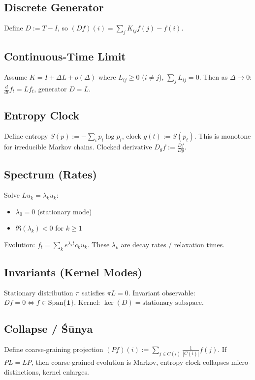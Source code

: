 \documentclass[12pt, oneside]{article}
\begin{document}
\subsection{Discrete Generator}

Define $D := T - I$, so $(Df)(i) = \sum_j K_{ij} f(j) - f(i)$.

\subsection{Continuous-Time Limit}

Assume $K = I + \Delta L + o(\Delta)$ where $L_{ij} \geq 0$ ($i \neq j$), $\sum_j L_{ij} = 0$. Then as $\Delta \to 0$: $\frac{d}{dt} f_t = L f_t$, generator $D = L$.

\subsection{Entropy Clock}

Define entropy $S(p) := -\sum_i p_i \log p_i$, clock $g(t) := S(p_t)$. This is monotone for irreducible Markov chains. Clocked derivative $D_g f := \frac{Df}{Dg}$.

\subsection{Spectrum (Rates)}

Solve $L u_k = \lambda_k u_k$:
\begin{itemize}
    \item $\lambda_0 = 0$ (stationary mode)
    \item $\Re(\lambda_k) < 0$ for $k \geq 1$
\end{itemize}
Evolution: $f_t = \sum_k e^{\lambda_k t} c_k u_k$. These $\lambda_k$ are decay rates / relaxation times.

\subsection{Invariants (Kernel Modes)}

Stationary distribution $\pi$ satisfies $\pi L = 0$. Invariant observable: $Df = 0 \iff f \in \text{Span}\{\mathbf{1}\}$. Kernel: $\ker(D) = \text{stationary subspace}$.

\subsection{Collapse / Śūnya}

Define coarse-graining projection $(Pf)(i) := \sum_{j \in C(i)} \frac{1}{|C(i)|} f(j)$. If $PL = LP$, then coarse-grained evolution is Markov, entropy clock collapses micro-distinctions, kernel enlarges.
\end{document}
